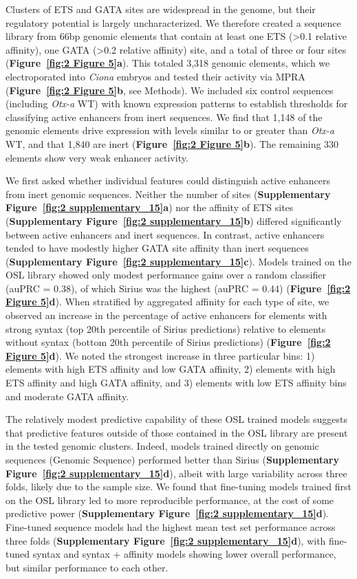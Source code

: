 Clusters of ETS and GATA sites are widespread in the genome, but their regulatory potential is largely uncharacterized. We therefore created a sequence library from 66bp genomic elements that contain at least one ETS (>0.1 relative affinity), one GATA (>0.2 relative affinity) site, and a total of three or four sites (\textbf{Figure~\ref{fig:2 Figure 5}a}). This totaled 3,318 genomic elements, which we electroporated into \textit{Ciona} embryos and tested their activity via MPRA (\textbf{Figure~\ref{fig:2 Figure 5}b}, see Methods). We included six control sequences (including \textit{Otx-a} WT) with known expression patterns to establish thresholds for classifying active enhancers from inert sequences. We find that 1,148 of the genomic elements drive expression with levels similar to or greater than \textit{Otx-a} WT, and that 1,840 are inert (\textbf{Figure~\ref{fig:2 Figure 5}b}). The remaining 330 elements show very weak enhancer activity.

We first asked whether individual features could distinguish active enhancers from inert genomic sequences. Neither the number of sites (\textbf{Supplementary Figure~\ref{fig:2 supplementary_15}a}) nor the affinity of ETS sites (\textbf{Supplementary Figure~\ref{fig:2 supplementary_15}b}) differed significantly between active enhancers and inert sequences. In contrast, active enhancers tended to have modestly higher GATA site affinity than inert sequences (\textbf{Supplementary Figure~\ref{fig:2 supplementary_15}c}). Models trained on the OSL library showed only modest performance gains over a random classifier (auPRC = 0.38), of which Sirius was the highest (auPRC = 0.44) (\textbf{Figure~\ref{fig:2 Figure 5}d}). When stratified by aggregated affinity for each type of site, we observed an increase in the percentage of active enhancers for elements with strong syntax (top 20th percentile of Sirius predictions) relative to elements without syntax (bottom 20th percentile of Sirius predictions) (\textbf{Figure~\ref{fig:2 Figure 5}d}). We noted the strongest increase in three particular bins: 1) elements with high ETS affinity and low GATA affinity, 2) elements with high ETS affinity and high GATA affinity, and 3) elements with low ETS affinity bins and moderate GATA affinity.

The relatively modest predictive capability of these OSL trained models suggests that predictive features outside of those contained in the OSL library are present in the tested genomic clusters. Indeed, models trained directly on genomic sequences (Genomic Sequence) performed better than Sirius (\textbf{Supplementary Figure~\ref{fig:2 supplementary_15}d}), albeit with large variability across three folds, likely due to the sample size. We found that fine-tuning models trained first on the OSL library led to more reproducible performance, at the cost of some predictive power (\textbf{Supplementary Figure~\ref{fig:2 supplementary_15}d}). Fine-tuned sequence models had the highest mean test set performance across three folds (\textbf{Supplementary Figure~\ref{fig:2 supplementary_15}d}), with fine-tuned syntax and syntax + affinity models showing lower overall performance, but similar performance to each other.

